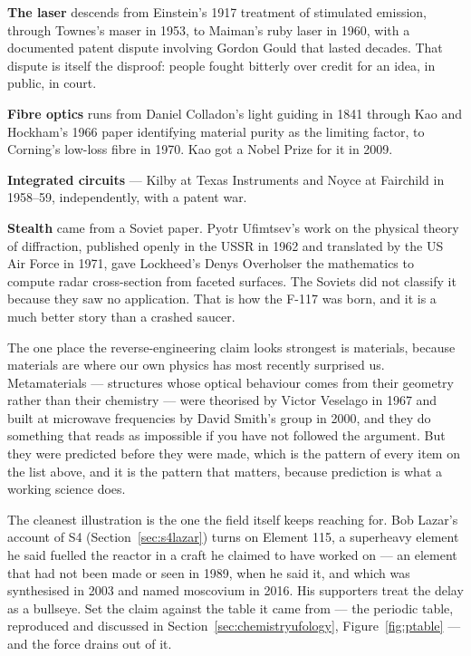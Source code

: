 \textbf{The laser} descends from Einstein's 1917 treatment of stimulated emission, through Townes's
maser in 1953, to Maiman's ruby laser in 1960, with a documented patent dispute involving Gordon
Gould that lasted decades. That dispute is itself the disproof: people fought bitterly over credit
for an idea, in public, in court.

\textbf{Fibre optics} runs from Daniel Colladon's light guiding in 1841 through Kao and Hockham's
1966 paper identifying material purity as the limiting factor, to Corning's low-loss fibre in
1970. Kao got a Nobel Prize for it in 2009.

\textbf{Integrated circuits} --- Kilby at Texas Instruments and Noyce at Fairchild in 1958--59,
independently, with a patent war.

\textbf{Stealth} came from a Soviet paper. Pyotr Ufimtsev's work on the physical theory of
diffraction, published openly in the USSR in 1962 and translated by the US Air Force in 1971, gave
Lockheed's Denys Overholser the mathematics to compute radar cross-section from faceted surfaces.
The Soviets did not classify it because they saw no application. That is how the F-117 was born,
and it is a much better story than a crashed saucer.

The one place the reverse-engineering claim looks strongest is materials, because materials are
where our own physics has most recently surprised us. Metamaterials --- structures whose optical
behaviour comes from their geometry rather than their chemistry --- were theorised by Victor
Veselago in 1967 and built at microwave frequencies by David Smith's group in 2000, and they do
something that reads as impossible if you have not followed the argument. But they were predicted
before they were made, which is the pattern of every item on the list above, and it is the pattern
that matters, because prediction is what a working science does. 

The cleanest illustration is the one the field itself keeps reaching for. Bob Lazar's account of S4
(Section~\ref{sec:s4lazar}) turns on Element 115, a superheavy element he said fuelled the reactor
in a craft he claimed to have worked on --- an element that had not been made or seen in 1989, when
he said it, and which was synthesised in 2003 and named moscovium in 2016. His supporters treat the
delay as a bullseye. Set the claim against the table it came from --- the periodic table, reproduced
and discussed in Section~\ref{sec:chemistryufology}, Figure~\ref{fig:ptable} --- and
the force drains out of it.

